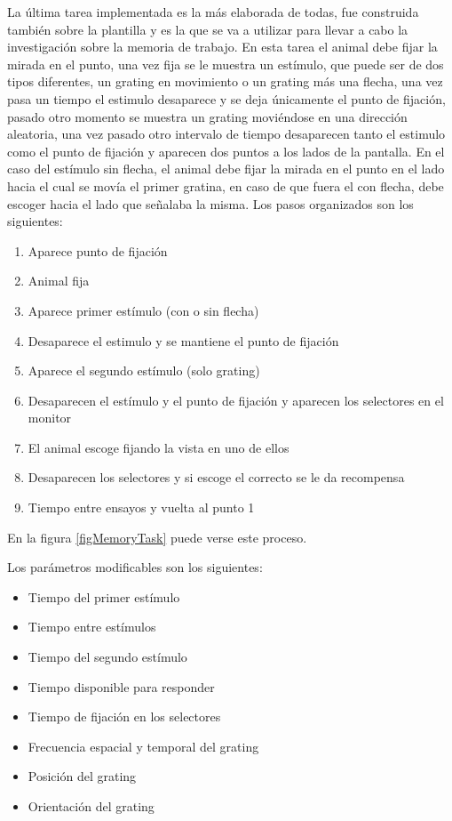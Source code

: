 \documentclass[conference]{IEEEtran}
\begin{document}
La última tarea implementada es la más elaborada de todas, fue construida también sobre la plantilla y es la que se va a utilizar para llevar a cabo la investigación sobre la memoria de trabajo. 
En esta tarea el animal debe fijar la mirada en el punto, una vez fija se le muestra un estímulo, que puede ser de dos tipos diferentes, un grating en movimiento o un grating más una flecha, una vez pasa un tiempo el estimulo desaparece y se deja únicamente el punto de fijación, pasado otro momento se muestra un grating moviéndose en una dirección aleatoria, una vez pasado otro intervalo de tiempo desaparecen tanto el estimulo como el punto de fijación y aparecen dos puntos a los lados de la pantalla. En el caso del estímulo sin flecha, el animal debe fijar la mirada en el punto en el lado hacia el cual se movía el primer gratina, en caso de que fuera el con flecha, debe escoger  hacia el lado que señalaba la misma.
Los pasos organizados son los siguientes:


\begin{enumerate}
	\item Aparece punto de fijación
	\item Animal fija
	\item Aparece primer estímulo (con o sin flecha)
	\item Desaparece el estimulo y se mantiene el punto de fijación
	\item Aparece el segundo estímulo (solo grating)
	\item Desaparecen el estímulo y el punto de fijación y aparecen los selectores en el monitor
	\item El animal escoge fijando la vista en uno de ellos
	\item Desaparecen los selectores y si escoge el correcto se le da recompensa
	\item Tiempo entre ensayos y vuelta al punto 1
\end{enumerate}

En la figura \ref{figMemoryTask} puede verse este proceso. 


Los parámetros modificables son los siguientes:

\begin{itemize}
	\item Tiempo del primer estímulo
	\item Tiempo entre estímulos
	\item Tiempo del segundo estímulo
	\item Tiempo disponible para responder
	\item Tiempo de fijación en los selectores
	\item Frecuencia espacial y temporal del grating
	\item Posición del grating
	\item Orientación del grating

\end{itemize}
\end{document}
